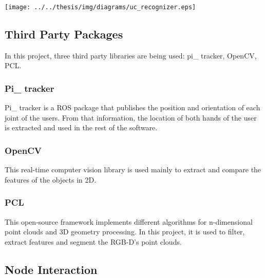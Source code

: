 \documentclass{article}
\begin{document}
\begin{center}
	\texttt{[image: ../../thesis/img/diagrams/uc\_recognizer.eps]}
\end{center}


\subsection{Third Party Packages}
\hspace{0.5cm}In this project, three third party libraries are being used: pi\_ tracker, OpenCV, PCL. 
\subsubsection{ Pi\_ tracker}
Pi\_ tracker is a ROS package that publishes the position and orientation of each joint of the users. From that information, the location of both hands of the user is extracted and used in the rest of the software. 
\subsubsection{ OpenCV}
This real-time computer vision library is used mainly to extract and compare the features of the objects in 2D. 
\subsubsection{PCL}
This open-source framework implements different algorithms for n-dimensional point clouds and 3D geometry processing.
In this project, it is used to filter, extract features and segment the RGB-D's point clouds.

\subsection{Node Interaction}
\end{document}
